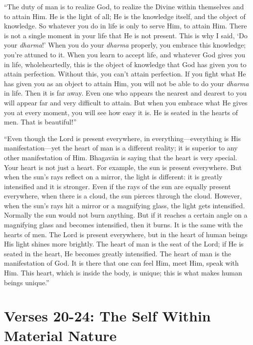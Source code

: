 \documentclass[12pt, twoside, openright]{memoir}
\begin{document}
\enquote{The duty of man is to realize God, to realize the Divine within themselves and to attain Him. He is the light of all; He is the knowledge itself, and the object of knowledge. So whatever you do in life is only to serve Him, to attain Him. There is not a single moment in your life that He is not present. This is why I said, \enquote{Do your \textit{dharma}!} When you do your \textit{dharma} properly, you embrace this knowledge; you’re attuned to it. When you learn to accept life, and whatever God gives you in life, wholeheartedly, this is the object of knowledge that God has given you to attain perfection. Without this, you can’t attain perfection. If you fight what He has given you as an object to attain Him, you will not be able to do your \textit{dharma} in life. Then it is far away. Even one who appears the nearest and dearest to you will appear far and very difficult to attain. But when you embrace what He gives you at every moment, you will see how easy it is. He is seated in the hearts of men. That is beautiful!}

\enquote{Even though the Lord is present everywhere, in everything---everything is His manifestation---yet the heart of man is a different reality; it is superior to any other manifestation of Him. Bhagavān is saying that the heart is very special. Your heart is not just a heart. For example, the sun is present everywhere. But when the sun’s rays reflect on a mirror, the light is different: it is greatly intensified and it is stronger. Even if the rays of the sun are equally present everywhere, when there is a cloud, the sun pierces through the cloud. However, when the sun’s rays hit a mirror or a magnifying glass, the light gets intensified. Normally the sun would not burn anything. But if it reaches a certain angle on a magnifying glass and becomes intensified, then it burns. It is the same with the hearts of men. The Lord is present everywhere, but in the heart of human beings His light shines more brightly. The heart of man is the seat of the Lord; if He is seated in the heart, He becomes greatly intensified. The heart of man is the manifestation of God. It is there that one can feel Him, meet Him, speak with Him. This heart, which is inside the body, is unique; this is what makes human beings unique.}

\section{Verses 20-24: The Self Within Material Nature}\label{sec-verses-20-24-the-self-within-material-nature}
\end{document}
